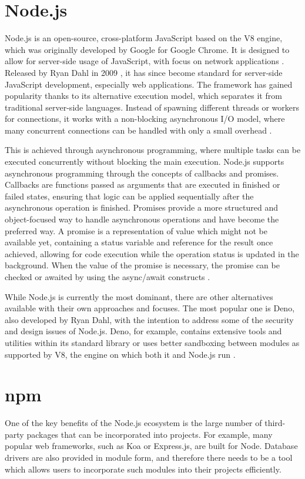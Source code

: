 \section*{Node.js}
Node.js is an open-source, cross-platform JavaScript based on the V8 engine,
which was originally developed by Google for Google Chrome. It is designed to
allow for server-side usage of JavaScript, with focus on network applications
\cite{node-about}. Released by Ryan Dahl in 2009 \cite{ryan-node}, it has since
become standard for server-side JavaScript development, especially web
applications. The framework has gained popularity thanks to its alternative
execution model, which separates it from traditional server-side languages.
Instead of spawning different threads or workers for connections, it works with
a non-blocking asynchronous I/O model, where many concurrent connections can be
handled with only a small overhead \cite{orsini_2013}.

This is achieved through asynchronous programming, where multiple tasks can be
executed concurrently without blocking the main execution. Node.js supports
asynchronous programming through the concepts of callbacks and promises.
Callbacks are functions passed as arguments that are executed in finished or
failed states, ensuring that logic can be applied sequentially after the
asynchronous operation is finished. Promises provide a more structured and
object-focused way to handle asynchronous operations and have become the
preferred way. A promise is a representation of value which might not be
available yet, containing a status variable and reference for the result once
achieved, allowing for code execution while the operation status is updated in
the background. When the value of the promise is necessary, the promise can be
checked or awaited by using the async/await constructs
\cite{PromiseJavaScriptMDN_2023}.

While Node.js is currently the most dominant, there are other alternatives
available with their own approaches and focuses. The most popular one is Deno,
also developed by Ryan Dahl, with the intention to address some of the security
and design issues of Node.js. Deno, for example, contains extensive tools and
utilities within its standard library or uses better sandboxing between modules
as supported by V8, the engine on which both it and Node.js run \cite{Deno}.

\section*{npm}
One of the key benefits of the Node.js ecosystem is the large number of
third-party packages that can be incorporated into projects. For example, many
popular web frameworks, such as Koa or Express.js, are built for Node. Database
drivers are also provided in module form, and therefore there needs to be a tool
which allows users to incorporate such modules into their projects efficiently. 

